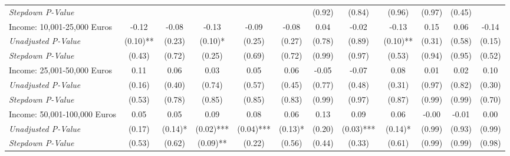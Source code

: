 \begin{tabular}{l c c c c c c c c c c c}
\quad \textit{Stepdown P-Value} &  &  &  &  &  & (0.92) & (0.84) & (0.96) & (0.97) & (0.45) &  \\
Income: 10,001-25,000 Euros & -0.12 & -0.08 & -0.13 & -0.09 & -0.08 & 0.04 & -0.02 & -0.13 & 0.15 & 0.06 & -0.14 \\
\quad \textit{Unadjusted P-Value} & (0.10)** & (0.23) & (0.10)* & (0.25) & (0.27) & (0.78) & (0.89) & (0.10)** & (0.31) & (0.58) & (0.15) \\
\quad \textit{Stepdown P-Value} & (0.43) & (0.72) & (0.25) & (0.69) & (0.72) & (0.99) & (0.97) & (0.53) & (0.94) & (0.95) & (0.52) \\
Income: 25,001-50,000 Euros & 0.11 & 0.06 & 0.03 & 0.05 & 0.06 & -0.05 & -0.07 & 0.08 & 0.01 & 0.02 & 0.10 \\
\quad \textit{Unadjusted P-Value} & (0.16) & (0.40) & (0.74) & (0.57) & (0.45) & (0.77) & (0.48) & (0.31) & (0.97) & (0.82) & (0.30) \\
\quad \textit{Stepdown P-Value} & (0.53) & (0.78) & (0.85) & (0.85) & (0.83) & (0.99) & (0.97) & (0.87) & (0.99) & (0.99) & (0.70) \\
Income: 50,001-100,000 Euros & 0.05 & 0.05 & 0.09 & 0.08 & 0.06 & 0.13 & 0.09 & 0.06 & -0.00 & -0.01 & 0.00 \\
\quad \textit{Unadjusted P-Value} & (0.17) & (0.14)* & (0.02)*** & (0.04)*** & (0.13)* & (0.20) & (0.03)*** & (0.14)* & (0.99) & (0.93) & (0.99) \\
\quad \textit{Stepdown P-Value} & (0.53) & (0.62) & (0.09)** & (0.22) & (0.56) & (0.44) & (0.33) & (0.61) & (0.99) & (0.99) & (0.98) \\
\bottomrule
\end{tabular}

